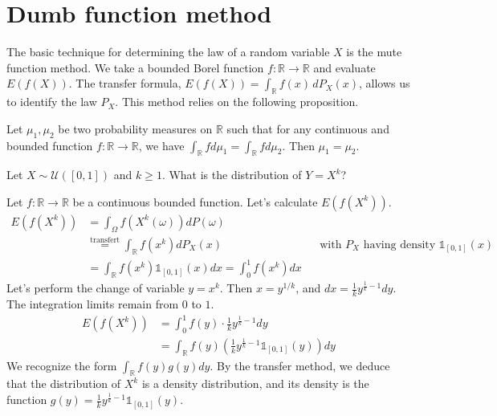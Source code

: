 \section{Dumb function method}%
The basic technique for determining the law of a random variable $X$ is the mute function method. We take a bounded Borel function $f: \mathbb{R} \to \mathbb{R}$ and evaluate $E(f(X))$. The transfer formula, $E(f(X)) = \int_{\mathbb{R}} f(x) \,dP_X(x)$, allows us to identify the law $P_X$.
This method relies on the following proposition.%
\begin{proposition}
Let $\mu_1, \mu_2$ be two probability measures on $\mathbb{R}$ such that for any continuous and bounded function $f: \mathbb{R} \to \mathbb{R}$, we have $\int_{\mathbb{R}} f d\mu_1 = \int_{\mathbb{R}} f d\mu_2$.
Then $\mu_1 = \mu_2$.
\end{proposition}%
\begin{example}
Let $X \sim \mathcal{U}([0,1])$ and $k \ge 1$. What is the distribution of $Y=X^k$?
\end{example}%
\begin{solution}
Let $f: \mathbb{R} \to \mathbb{R}$ be a continuous bounded function. Let's calculate $E(f(X^k))$.
\begin{align*}
E(f(X^k)) &= \int_{\Omega} f(X^k(\omega)) dP(\omega) && \\
           &\stackrel{\text{transfert}}{=} \int_{\mathbb{R}} f(x^k) dP_X(x) && \text{with } P_X \text{ having density } \mathbb{1}_{[0,1]}(x) \\
           &= \int_{\mathbb{R}} f(x^k) \mathbb{1}_{[0,1]}(x) dx = \int_0^1 f(x^k) dx
\end{align*}
Let's perform the change of variable $y = x^k$. Then $x = y^{1/k}$, and $dx = \frac{1}{k} y^{\frac{1}{k}-1} dy$. The integration limits remain from $0$ to $1$.
\begin{align*}
E(f(X^k)) &= \int_0^1 f(y) \cdot \frac{1}{k} y^{\frac{1}{k}-1} dy \\
           &= \int_{\mathbb{R}} f(y) \left( \frac{1}{k} y^{\frac{1}{k}-1} \mathbb{1}_{[0,1]}(y) \right) dy
\end{align*}
We recognize the form $\int_{\mathbb{R}} f(y) g(y) dy$. By the transfer method, we deduce that the distribution of $X^k$ is a density distribution, and its density is the function $g(y) = \frac{1}{k} y^{\frac{1}{k}-1} \mathbb{1}_{[0,1]}(y)$.
\end{solution}
